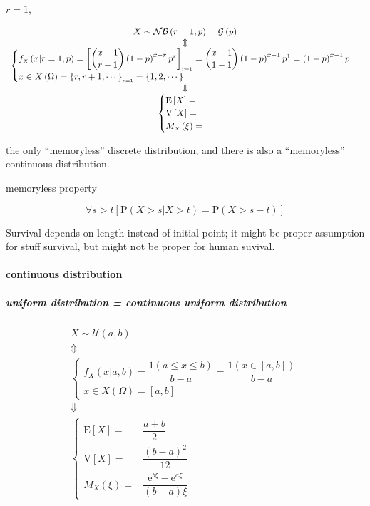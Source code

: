 \documentclass[
]{book}
\theoremstyle{definition}
\theoremstyle{definition}
\theoremstyle{definition}
\theoremstyle{definition}
\theoremstyle{remark}
\begin{document}
\(r=1\),

\[
\begin{array}{c}
X\sim\mathcal{NB}\left(r=1,p\right)=\mathcal{G}\left(p\right)\\
\Updownarrow\\
\begin{cases}
f_{{\scriptscriptstyle X}}\left(x|r=1,p\right)=\left[\dbinom{x-1}{r-1}\left(1-p\right)^{x-r}p^{r}\right]_{{\scriptscriptstyle r=1}}=\dbinom{x-1}{1-1}\left(1-p\right)^{x-1}p^{1}=\left(1-p\right)^{x-1}p\\
x\in X\left(\Omega\right)=\left\{ r,r+1,\cdots\right\} _{{\scriptscriptstyle r=1}}=\left\{ 1,2,\cdots\right\} 
\end{cases}\\
\Downarrow\\
\begin{cases}
\mathrm{E}\left[X\right]=\\
\mathrm{V}\left[X\right]=\\
M_{{\scriptscriptstyle X}}\left(\xi\right)=
\end{cases}
\end{array}
\]

the only ``memoryless'' discrete distribution, and there is also a ``memoryless'' continuous distribution.

memoryless property

\[
\forall s>t\left[\mathrm{P}\left(X>s|X>t\right)=\mathrm{P}\left(X>s-t\right)\right]
\]

Survival depends on length instead of initial point; it might be proper assumption for stuff survival, but might not be proper for human suvival.

\paragraph{continuous distribution}\label{continuous-distribution}

\subparagraph{uniform distribution = continuous uniform distribution}\label{uniform-distribution-continuous-uniform-distribution}

\[
\begin{array}{c}
X\sim\mathcal{U}\left(a,b\right)\\
\Updownarrow\\
\begin{cases}
f_{{\scriptscriptstyle X}}\left(x|a,b\right)=\dfrac{1\left(a\le x\le b\right)}{b-a}=\dfrac{1\left(x\in\left[a,b\right]\right)}{b-a}\\
x\in X\left(\Omega\right)=\left[a,b\right]
\end{cases}\\
\Downarrow\\
\begin{cases}
\mathrm{E}\left[X\right]= & \dfrac{a+b}{2}\\
\mathrm{V}\left[X\right]= & \dfrac{\left(b-a\right)^{2}}{12}\\
M_{{\scriptscriptstyle X}}\left(\xi\right)= & \dfrac{\mathrm{e}^{b\xi}-\mathrm{e}^{a\xi}}{\left(b-a\right)\xi}
\end{cases}
\end{array}
\]
\end{document}
